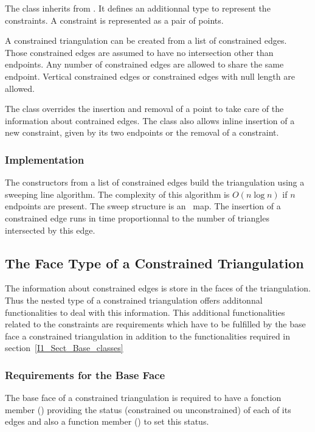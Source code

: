 The class 
inherits from .
It defines an additionnal type 
to represent the constraints. A
constraint is represented as a pair of points.

A  constrained triangulation can be created
from a
list of constrained edges. Those constrained edges are assumed to have no
intersection other than endpoints. Any number of constrained edges are
allowed to share the same endpoint.  Vertical constrained edges or
constrained edges with null length are allowed.

The class 
overrides the insertion and removal of a point to take care of the
information about contrained edges. The class also allows inline
insertion of a new constraint, given by its two endpoints
or the removal of a constraint.


\subsubsection{Implementation}

The constructors from a list of constrained edges
build the triangulation using a sweeping line
algorithm. The complexity of this algorithm is $O(n\log n)$ if $n$
endpoints are present. The sweep structure is an \stl\ map.
 The insertion of a constrained edge runs in time
proportionnal to the number of triangles intersected by this edge.



\subsection{The Face Type of a Constrained Triangulation}
\label{I1_Sect_Constrained_face}
 The information about constrained edges is store in the 
faces of the triangulation. Thus the nested 
type of a constrained triangulation offers
additonnal functionalities to deal with this information.
This additional functionalities related to the constraints
are requirements which have to be fulfilled
by the base face  a constrained triangulation
in addition to the functionalities required in section~\ref{I1_Sect_Base_classes}

\subsubsection{Requirements for the Base Face}
The base face of a constrained triangulation is required
to have a fonction member
()
 providing the status
(constrained ou unconstrained) of each of its edges
and also a function member
() to set this status.


